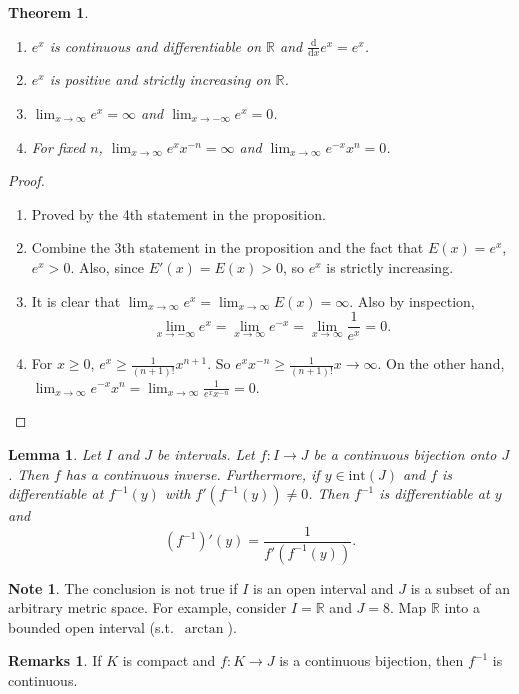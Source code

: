 \documentclass[12pt]{article}
\theoremstyle{plain}
\newtheorem{thm}{Theorem}
\newtheorem*{lemma}{Lemma}
\theoremstyle{definition}
\newtheorem*{Remarks}{Remarks}
\newtheorem*{note}{Note}
\begin{document}
\begin{thm}
    \begin{enumerate}
        \item $e^x$ is continuous and differentiable on $\mathbb{R}$ and $\frac{\mathrm{d}}{\mathrm{d} x}e^x = e^x$.
        \item $e^x$ is positive and strictly increasing on $\mathbb{R}$.
        \item $\lim_{x\rightarrow\infty}e^x= \infty$ and $\lim_{x\rightarrow-\infty}e^x = 0$.
        \item For fixed $n$, $\lim_{x\rightarrow\infty}e^x x^{-n} = \infty$ and $\lim_{x\rightarrow \infty}e^{-x}x^n = 0$.
    \end{enumerate}
\end{thm}
\begin{proof}
    \begin{enumerate}
        \item Proved by the 4th statement in the proposition.
        \item Combine the 3th statement in the proposition and the fact that $E(x) =e^x$, $e^x>0$.
            Also, since $E'(x) = E(x)>0$, so $e^x$ is strictly increasing.
        \item It is clear that $\lim_{x\rightarrow\infty} e^x = \lim_{x\rightarrow\infty}E(x) =  \infty$.
            Also by inspection,
            \[\lim_{x\rightarrow-\infty} e^x = \lim_{x\rightarrow\infty}e^{-x} = \lim_{x\rightarrow\infty}\frac{1}{e^x} = 0.\]
        \item For $x\geq 0$, $e^x\geq \frac{1}{(n+1)!} x^{n+1}$.
            So $e^x x^{-n}\geq\frac{1}{(n+1)!}x\rightarrow\infty$.
            On the other hand, $\lim_{x\rightarrow\infty} e^{-x}x^n = \lim_{x\rightarrow\infty}\frac{1}{e^x x^{-n}}= 0 $.
    \end{enumerate}
\end{proof}

\begin{lemma}
    Let $I$ and $J$ be intervals.
    Let $f: I\rightarrow J$ be a continuous bijection onto $J$.
    Then $f$ has a continuous inverse.
    Furthermore, if $y\in\text{int}(J)$ and $f$ is differentiable at $f^{-1}(y)$ with $f'(f^{-1}(y))\neq 0$.
    Then $f^{-1}$ is differentiable at $y$ and 
    \[(f^{-1})'(y) = \frac{1}{f'(f^{-1}(y))}.\]
\end{lemma}
\begin{note}
    The conclusion is not true if $I$ is an open interval and $J$ is a subset of an arbitrary metric space.
    For example, consider $I=\mathbb{R}$ and $J=8$.
    Map $\mathbb{R}$ into a bounded open interval (s.t.\ $\arctan$).
\end{note}
\begin{Remarks}
    If $K$ is compact and $f:K\rightarrow J$ is a continuous bijection, then $f^{-1}$ is continuous.
\end{Remarks}
\end{document}
